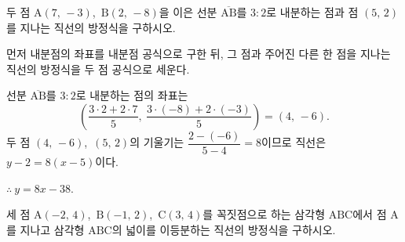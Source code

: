 \documentclass[10pt]{article}
\begin{document}
\newpage


\begin{dmproblem}
두 점 $\mathrm{A}(7,\, -3)$,\ $\mathrm{B}(2,\, -8)$을 이은 선분 $\overline{\mathrm{AB}}$를 $3 : 2$로 내분하는 점과 점 $(5,\, 2)$를 지나는 직선의 방정식을 구하시오.
\end{dmproblem}

\begin{dmapproach}
먼저 내분점의 좌표를 내분점 공식으로 구한 뒤, 그 점과 주어진 다른 한 점을 지나는 직선의 방정식을 두 점 공식으로 세운다.
\end{dmapproach}

\begin{dmsolution}
선분 $\overline{\mathrm{AB}}$를 $3 : 2$로 내분하는 점의 좌표는
\begin{equation*}
  \left( \frac{3 \cdot 2 + 2 \cdot 7}{5},\ \frac{3 \cdot (-8) + 2 \cdot (-3)}{5} \right) = (4,\, -6).
\end{equation*}
두 점 $(4,\, -6)$,\ $(5,\, 2)$의 기울기는 $\dfrac{2-(-6)}{5-4} = 8$이므로 직선은 $y - 2 = 8(x - 5)$이다.

$\therefore\ y = 8x - 38$.
\end{dmsolution}

\dmchecktitle



\newpage


\begin{dmproblem}
세 점 $\mathrm{A}(-2,\, 4)$,\ $\mathrm{B}(-1,\, 2)$,\ $\mathrm{C}(3,\, 4)$를 꼭짓점으로 하는 삼각형 $\mathrm{ABC}$에서 점 $\mathrm{A}$를 지나고 삼각형 $\mathrm{ABC}$의 넓이를 이등분하는 직선의 방정식을 구하시오.
\end{dmproblem}
\end{document}
